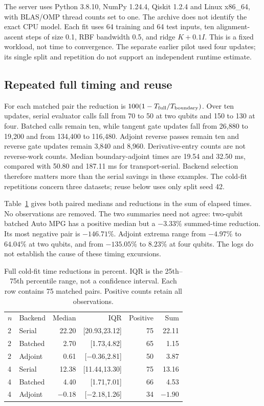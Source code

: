 The server uses Python 3.8.10, NumPy 1.24.4, Qiskit 1.2.4 and Linux
x86\_64, with BLAS/OMP thread counts set to one. The archive does not
identify the exact CPU model. Each fit uses 64 training and 64 test
inputs, ten alignment-ascent steps of size 0.1, RBF bandwidth 0.5,
and ridge $K+0.1I$. This is a fixed workload, not time to convergence.
The separate earlier pilot used four updates; its single split and
repetition do not support an independent runtime estimate.

\subsection{Repeated full timing and reuse}
\label{app:full_time}
For each matched pair the reduction is $100(1-T_{\rm full}/T_{\rm boundary})$.
Over ten updates, serial evaluator calls fall from 70 to 50 at two
qubits and 150 to 130 at four. Batched calls remain ten, while tangent
gate updates fall from 26,880 to 19,200 and from 134,400 to 116,480.
Adjoint reverse passes remain ten and reverse gate updates remain
3,840 and 8,960. Derivative-entry counts are not reverse-work counts.
Median boundary-adjoint times are 19.54 and 32.50 ms, compared with
50.80 and 187.11 ms for transport-serial. Backend selection therefore
matters more than the serial savings in these examples. The cold-fit
repetitions concern three datasets; reuse below uses only split seed 42.

Table~\ref{tab:full_time} gives both paired medians and reductions in
the sum of elapsed times. No observations are removed. The two summaries
need not agree: two-qubit batched Auto MPG has a positive median but
a $-3.33\%$ summed-time reduction. Its most negative pair is
$-146.71\%$. Adjoint extrema range from $-4.97\%$ to $64.04\%$
at two qubits, and from $-135.05\%$ to $8.23\%$ at four qubits.
The logs do not establish the cause of these timing excursions.

\begin{table}[t]
\caption{Full cold-fit time reductions in percent. IQR is the
25th--75th percentile range, not a confidence interval. Each row
contains 75 matched pairs. Positive counts retain all observations.}
\label{tab:full_time}
\begin{tabular}{llrrrr}
\toprule
$n$ & Backend & Median & IQR & Positive & Sum\\
2 & Serial & 22.20 & [20.93,23.12] & 75 & 22.11\\
2 & Batched & 2.70 & [1.73,4.82] & 65 & 1.15\\
2 & Adjoint & 0.61 & [$-0.36$,2.81] & 50 & 3.87\\
4 & Serial & 12.38 & [11.44,13.30] & 75 & 13.16\\
4 & Batched & 4.40 & [1.71,7.01] & 66 & 4.53\\
4 & Adjoint & $-0.18$ & [$-2.18$,1.26] & 34 & $-1.90$\\
\bottomrule
\end{tabular}
\end{table}

